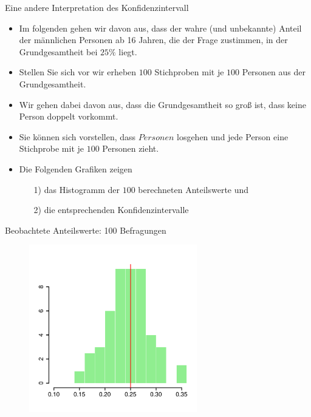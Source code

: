 \documentclass[usenames,dvipsnames,handout]{beamer}
\begin{document}
\begin{frame}{Eine andere Interpretation des Konfidenzintervall}
\begin{itemize}
\item{Im folgenden gehen wir davon aus, dass der wahre (und unbekannte) Anteil der männlichen Personen ab
16 Jahren, die der Frage zustimmen, in der Grundgesamtheit bei $25\%$ liegt.}\pause
\item{Stellen Sie sich vor wir erheben $100$ Stichproben mit je $100$ Personen aus der Grundgesamtheit.}\pause
\item{Wir gehen dabei davon aus, dass die Grundgesamtheit so groß ist, dass keine Person doppelt vorkommt.}\pause
\item{Sie können sich vorstellen, dass $Personen$ losgehen und jede Person eine Stichprobe mit je
$100$ Personen zieht.}\pause
\item{Die Folgenden Grafiken zeigen 
\begin{itemize}
\item[1)]{das Histogramm der $100$ berechneten Anteilswerte und}
\item[2)]{die entsprechenden Konfidenzintervalle}
\end{itemize}
}
\end{itemize}
\end{frame}

\begin{frame}{Beobachtete Anteilswerte: 100 Befragungen}
  \begin{figure}[ht]
 	\centering
 	      \includegraphics[width=0.65\textwidth]{prob_est.pdf}%
 	\end{figure}
\end{frame}
\end{document}
